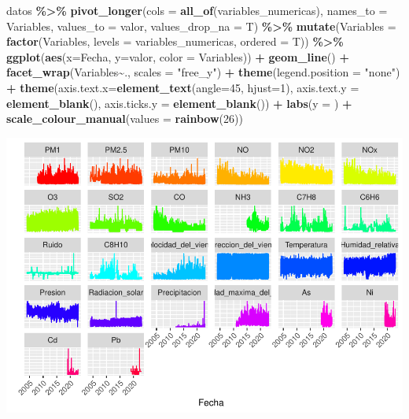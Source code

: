 \documentclass[notspecified,article,submit,moreauthors,pdftex]{Definitions/mdpi}
\newenvironment{Shaded}{\begin{snugshade}}{\end{snugshade}}
\newcommand{\AttributeTok}[1]{\textcolor[rgb]{0.13,0.29,0.53}{#1}}
\newcommand{\DecValTok}[1]{\textcolor[rgb]{0.00,0.00,0.81}{#1}}
\newcommand{\FunctionTok}[1]{\textcolor[rgb]{0.13,0.29,0.53}{\textbf{#1}}}
\newcommand{\NormalTok}[1]{#1}
\newcommand{\SpecialCharTok}[1]{\textcolor[rgb]{0.81,0.36,0.00}{\textbf{#1}}}
\newcommand{\StringTok}[1]{\textcolor[rgb]{0.31,0.60,0.02}{#1}}
\begin{document}
\begin{Shaded}
\begin{Highlighting}[]
\NormalTok{datos }\SpecialCharTok{\%\textgreater{}\%} 
  \FunctionTok{pivot\_longer}\NormalTok{(}\AttributeTok{cols =} \FunctionTok{all\_of}\NormalTok{(variables\_numericas), }\AttributeTok{names\_to =} \StringTok{\textquotesingle{}Variables\textquotesingle{}}\NormalTok{, }\AttributeTok{values\_to =} \StringTok{\textquotesingle{}valor\textquotesingle{}}\NormalTok{, }\AttributeTok{values\_drop\_na =}\NormalTok{ T) }\SpecialCharTok{\%\textgreater{}\%} 
  \FunctionTok{mutate}\NormalTok{(}\AttributeTok{Variables =} \FunctionTok{factor}\NormalTok{(Variables, }\AttributeTok{levels =}\NormalTok{ variables\_numericas, }\AttributeTok{ordered =}\NormalTok{ T)) }\SpecialCharTok{\%\textgreater{}\%} 
  \FunctionTok{ggplot}\NormalTok{(}\FunctionTok{aes}\NormalTok{(}\AttributeTok{x=}\NormalTok{Fecha, }\AttributeTok{y=}\NormalTok{valor, }\AttributeTok{color =}\NormalTok{ Variables)) }\SpecialCharTok{+} 
  \FunctionTok{geom\_line}\NormalTok{() }\SpecialCharTok{+} 
  \FunctionTok{facet\_wrap}\NormalTok{(Variables}\SpecialCharTok{\textasciitilde{}}\NormalTok{., }\AttributeTok{scales =} \StringTok{"free\_y"}\NormalTok{) }\SpecialCharTok{+} 
  \FunctionTok{theme}\NormalTok{(}\AttributeTok{legend.position =} \StringTok{"none"}\NormalTok{) }\SpecialCharTok{+} 
  \FunctionTok{theme}\NormalTok{(}\AttributeTok{axis.text.x=}\FunctionTok{element\_text}\NormalTok{(}\AttributeTok{angle=}\DecValTok{45}\NormalTok{, }\AttributeTok{hjust=}\DecValTok{1}\NormalTok{), }\AttributeTok{axis.text.y =} \FunctionTok{element\_blank}\NormalTok{(), }\AttributeTok{axis.ticks.y =} \FunctionTok{element\_blank}\NormalTok{()) }\SpecialCharTok{+} 
  \FunctionTok{labs}\NormalTok{(}\AttributeTok{y =} \StringTok{\textquotesingle{}\textquotesingle{}}\NormalTok{) }\SpecialCharTok{+} 
  \FunctionTok{scale\_colour\_manual}\NormalTok{(}\AttributeTok{values =} \FunctionTok{rainbow}\NormalTok{(}\DecValTok{26}\NormalTok{)) }
\end{Highlighting}
\end{Shaded}

\includegraphics{ProyectoAED2023_plantilla_files/figure-latex/unnamed-chunk-12-1.pdf}
\end{document}
